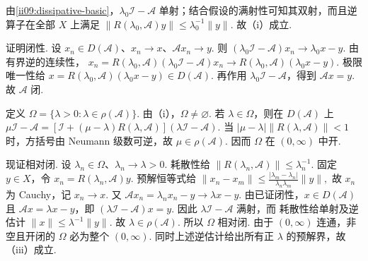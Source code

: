 \begin{FAProof}
由\autoref{ii09:dissipative-basic}，\(\displaystyle\lambda_0\mathcal I-\mathcal A\) 单射；结合假设的满射性可知其双射，而且逆算子在全部 \(\displaystyle X\) 上满足 \(\displaystyle \|R(\lambda_0,\mathcal A)y\| \leqslant \lambda_0^{-1}\|y\|.\)
故（i）成立.

证明闭性. 设 \(\displaystyle x_n\in D(\mathcal A)\)、\(\displaystyle x_n\to x\)、\(\displaystyle\mathcal Ax_n\to y\). 则 \(\displaystyle (\lambda_0\mathcal I-\mathcal A)x_n \longrightarrow \lambda_0x-y.\)
由有界逆的连续性， \(\displaystyle x_n = R(\lambda_0,\mathcal A)(\lambda_0\mathcal I-\mathcal A)x_n \longrightarrow R(\lambda_0,\mathcal A)(\lambda_0x-y).\)
极限唯一性给 \(\displaystyle x = R(\lambda_0,\mathcal A)(\lambda_0x-y) \in D(\mathcal A).\)
再作用 \(\displaystyle\lambda_0\mathcal I-\mathcal A\)，得到 \(\displaystyle\mathcal Ax=y\). 故 \(\displaystyle\mathcal A\) 闭.

定义 \(\displaystyle \Omega = \{\lambda>0:\lambda\in\rho(\mathcal A)\}.\)
由（i），\(\displaystyle\Omega\neq\varnothing\). 若 \(\displaystyle\lambda\in\Omega\)，则在 \(\displaystyle D(\mathcal A)\) 上 \(\displaystyle \mu\mathcal I-\mathcal A = [\mathcal I+(\mu-\lambda)R(\lambda,\mathcal A)] (\lambda\mathcal I-\mathcal A).\)
当 \(\displaystyle|\mu-\lambda|\|R(\lambda,\mathcal A)\|<1\) 时，方括号由 Neumann 级数可逆，故 \(\displaystyle\mu\in\rho(\mathcal A)\). 因而 \(\displaystyle\Omega\) 在 \(\displaystyle(0,\infty)\) 中开.

现证相对闭. 设 \(\displaystyle\lambda_n\in\Omega\)、\(\displaystyle\lambda_n\to\lambda>0\). 耗散性给 \(\displaystyle \|R(\lambda_n,\mathcal A)\| \leqslant \lambda_n^{-1}.\)
固定 \(\displaystyle y\in X\)，令 \(\displaystyle x_n=R(\lambda_n,\mathcal A)y\). 预解恒等式给 \(\displaystyle \|x_n-x_m\| \leqslant \frac{|\lambda_m-\lambda_n|}{\lambda_n\lambda_m}\|y\|,\)
故 \(\displaystyle x_n\) 为 Cauchy，记 \(\displaystyle x_n\to x\). 又 \(\displaystyle \mathcal Ax_n = \lambda_nx_n-y \longrightarrow \lambda x-y.\)
由已证闭性，\(\displaystyle x\in D(\mathcal A)\) 且 \(\displaystyle\mathcal Ax=\lambda x-y\)，即 \(\displaystyle (\lambda\mathcal I-\mathcal A)x=y.\)
因此 \(\displaystyle\lambda\mathcal I-\mathcal A\) 满射，而 耗散性给单射及逆估计 \(\displaystyle \|x\| \leqslant \lambda^{-1}\|y\|.\)
故 \(\displaystyle\lambda\in\rho(\mathcal A)\). 所以 \(\displaystyle\Omega\) 相对闭. 由于 \(\displaystyle(0,\infty)\) 连通，非空且开闭的 \(\displaystyle\Omega\) 必为整个 \(\displaystyle(0,\infty)\). 同时上述逆估计给出所有正 \(\displaystyle\lambda\) 的预解界，故（iii）成立.


\end{FAProof}
